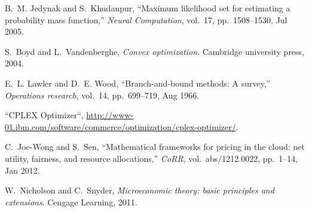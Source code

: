 \documentclass[10pt,journal,compsoc]{IEEEtran}
\begin{document}
\begin{thebibliography}{10}
B.~M. Jedynak and S.~Khudanpur, ``Maximum likelihood set for estimating a
  probability mass function,'' {\em Neural Computation}, vol.~17,
  pp.~1508--1530, Jul 2005.

S.~Boyd and L.~Vandenberghe, {\em Convex optimization}.
\newblock Cambridge university press, 2004.

E.~L. Lawler and D.~E. Wood, ``Branch-and-bound methods: A survey,'' {\em
  Operations research}, vol.~14, pp.~699--719, Aug 1966.

``CPLEX Optimizer``, \url{http://www-01.ibm.com/software/commerce/optimization/cplex-optimizer/}.

C.~Joe-Wong and S.~Sen, ``Mathematical frameworks for pricing in the cloud:
  net utility, fairness, and resource allocations,'' {\em CoRR},
  vol.~abs/1212.0022, pp.~1--14, Jan 2012.

W.~Nicholson and C.~Snyder, {\em Microeconomic theory: basic principles and
  extensions}.
\newblock Cengage Learning, 2011.

\end{thebibliography}
\end{document}
